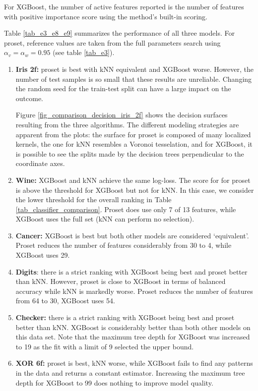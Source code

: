 For XGBoost, the number of active features reported is the number of features with positive importance score using the method's built-in scoring.\par
%
Table \ref{tab_e3_e8_e9} summarizes the performance of all three models.
For proset, reference values are taken from the full parameters search using $\alpha_v=\alpha_w=0.95$ (see table \ref{tab_e3}).\par
%
\begin{enumerate}
\item\textbf{Iris 2f:} proset is best with kNN equivalent and XGBoost worse.
However, the number of test samples is so small that these results are unreliable.
Changing the random seed for the train-test split can have a large impact on the outcome.\par
%
Figure \ref{fig_comparison_decision_iris_2f} shows the decision surfaces resulting from the three algorithms.
The different modeling strategies are apparent from the plots: the surface for proset is composed of many localized kernels, the one for kNN resembles a Voronoi tesselation, and for XGBoost, it is possible to see the splits made by the decision trees perpendicular to the coordinate axes.
%
\item\textbf{Wine:} XGBoost and kNN achieve the same log-loss.
The score for for proset is above the threshold for XGBoost but not for kNN.
In this case, we consider the lower threshold for the overall ranking in Table \ref{tab_classifier_comparison}.
Proset does use only 7 of 13 features, while XGBoost uses the full set (kNN can perform no selection).
%
\item\textbf{Cancer:} XGBoost is best but both other models are considered `equivalent'.
Proset reduces the number of features considerably from 30 to 4, while XGBoost uses 29.
%
\item\textbf{Digits}: there is a strict ranking with XGBoost being best and proset better than kNN.
However, proset is close to XGBoost in terms of balanced accuracy while kNN is markedly worse.
Proset reduces the number of features from 64 to 30, XGBoost uses 54.
%
\item\textbf{Checker:} there is a strict ranking with XGBoost being best and proset better than kNN.
XGBoost is considerably better than both other models on this data set.
Note that the maximum tree depth for XGBoost was increased to 19 as the fit with a limit of 9 selected the upper bound.
%
\item\textbf{XOR 6f:} proset is best, kNN worse, while XGBoost fails to find any patterns in the data and returns a constant estimator.
Increasing the maximum tree depth for XGBoost to 99 does nothing to improve model quality.
\end{enumerate}
